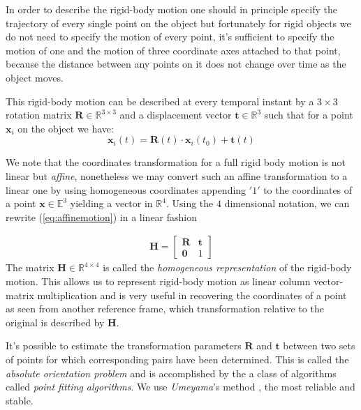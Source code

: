 \documentclass[acmtocl,acmnow]{acmtrans2m}
\begin{document}
In order to describe the rigid-body motion one should in
principle specify the trajectory of every single point on the object but
fortunately for rigid objects we do not need to specify the
motion of every point, it's sufficient to specify the motion of one and the
motion of three coordinate axes attached to that point, because the distance
between any points on it does not change over time as the object moves.

This rigid-body motion can be described at every temporal instant by a $3\times
3$ rotation matrix $\mathbf{R} \in \mathbb{R}^{3\times 3}$ and a displacement
vector $\mathbf{t} \in \mathbb{R}^{3}$ such that for a point $\mathbf{x}_i$ on
the object we have:
\begin{equation}\label{eq:affinemotion}
  \mathbf{x}_i(t) = \mathbf{R}(t)\cdot \mathbf{x}_i(t_0) + \mathbf{t}(t)
\end{equation}

We note that the coordinates transformation for a full rigid body motion is not
linear but \emph{affine}, nonetheless we may convert such an 
affine transformation to a linear one by using homogeneous coordinates appending
$'1'$ to the coordinates of a point $\mathbf{x} \in \mathbb{E}^3$ yielding
a vector  in $\mathbb{R}^4$. Using the $4$ dimensional notation, we can rewrite (\ref{eq:affinemotion}) in a linear fashion

\begin{align}\label{eq:homogenized}
\mathbf{H} = \begin{bmatrix} \mathbf{R} & \mathbf{t} \\ \mathbf{0} & 1
\end{bmatrix}
\end{align}
The matrix $\mathbf{H}\in \mathbb{R}^{4\times 4}$ is called the
\emph{homogeneous representation} of the rigid-body motion. This allows us 
to represent rigid-body motion as linear column vector-matrix multiplication and is very useful in recovering the coordinates of a point as seen from another reference frame, which transformation relative to the original is described by $\mathbf{H}$.

It's possible to estimate the transformation parameters $\mathbf{R}$ and
$\mathbf{t}$ between two sets of points for which corresponding pairs have been determined. This is called the \emph{absolute orientation problem} and is accomplished by the a class of algorithms called \emph{point fitting algorithms}. We use \emph{Umeyama}'s method \cite{umeyama}, the most reliable and stable. 
\end{document}
